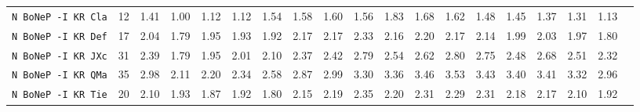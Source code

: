\begin{tabular}{l | r @{~~} r | r@{~~}r@{~~}r@{~~}r@{~~}r@{~~}r@{~~}r@{~~}r@{~~}r@{~~}r@{~~}r@{~~}r@{~~}r@{~~}r@{~~}r@{~~}r|}
\verb+N BoNeP -I KR Cla+ & 12 & 1.41 & 1.00&1.12&1.12&1.54&1.58&1.60&1.56&1.83&1.68&1.62&1.48&1.45&1.37&1.31&1.13\\
\verb+N BoNeP -I KR Def+ & 17 & 2.04 & 1.79&1.95&1.93&1.92&2.17&2.17&2.33&2.16&2.20&2.17&2.14&1.99&2.03&1.97&1.80\\
\verb+N BoNeP -I KR JXc+ & 31 & 2.39 & 1.79&1.95&2.01&2.10&2.37&2.42&2.79&2.54&2.62&2.80&2.75&2.48&2.68&2.51&2.32\\
\verb+N BoNeP -I KR QMa+ & 35 & 2.98 & 2.11&2.20&2.34&2.58&2.87&2.99&3.30&3.36&3.46&3.53&3.43&3.40&3.41&3.32&2.96\\
\verb+N BoNeP -I KR Tie+ & 20 & 2.10 & 1.93&1.87&1.92&1.80&2.15&2.19&2.35&2.20&2.31&2.29&2.31&2.18&2.17&2.10&1.92\\
\end{tabular}
